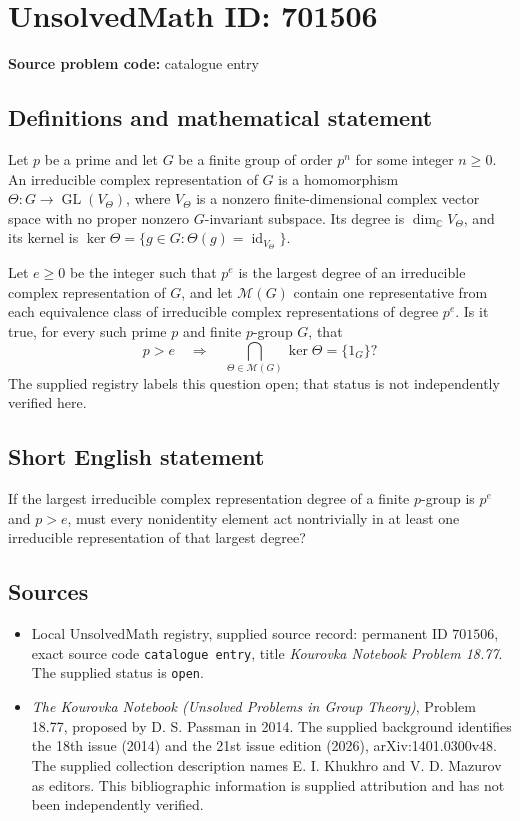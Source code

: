 \documentclass[11pt]{article}
\newcommand{\C}{\mathbb{C}}
\begin{document}
\section*{UnsolvedMath ID: 701506}
\textbf{Source problem code:} catalogue entry
\subsection{Definitions and mathematical statement}
Let \(p\) be a prime and let \(G\) be a finite group of order \(p^n\) for some integer \(n\geq 0\). An irreducible complex representation of \(G\) is a homomorphism \(\Theta:G\to\operatorname{GL}(V_\Theta)\), where \(V_\Theta\) is a nonzero finite-dimensional complex vector space with no proper nonzero \(G\)-invariant subspace. Its degree is \(\dim_{\C}V_\Theta\), and its kernel is \(\ker\Theta=\{g\in G:\Theta(g)=\operatorname{id}_{V_\Theta}\}\).

Let \(e\geq 0\) be the integer such that \(p^e\) is the largest degree of an irreducible complex representation of \(G\), and let \(\mathcal M(G)\) contain one representative from each equivalence class of irreducible complex representations of degree \(p^e\). Is it true, for every such prime \(p\) and finite \(p\)-group \(G\), that
\[
 p>e\quad\Longrightarrow\quad
 \bigcap_{\Theta\in\mathcal M(G)}\ker\Theta=\{1_G\}?
\]
The supplied registry labels this question open; that status is not independently verified here.
\subsection{Short English statement}
If the largest irreducible complex representation degree of a finite \(p\)-group is \(p^e\) and \(p>e\), must every nonidentity element act nontrivially in at least one irreducible representation of that largest degree?
\subsection{Sources}
\begin{itemize}
\item Local UnsolvedMath registry, supplied source record: permanent ID \(701506\), exact source code \texttt{catalogue entry}, title \emph{Kourovka Notebook Problem 18.77}. The supplied status is \texttt{open}.
\item \emph{The Kourovka Notebook (Unsolved Problems in Group Theory)}, Problem 18.77, proposed by D. S. Passman in 2014. The supplied background identifies the 18th issue (2014) and the 21st issue edition (2026), arXiv:1401.0300v48. The supplied collection description names E. I. Khukhro and V. D. Mazurov as editors. This bibliographic information is supplied attribution and has not been independently verified.
\end{itemize}
\end{document}

